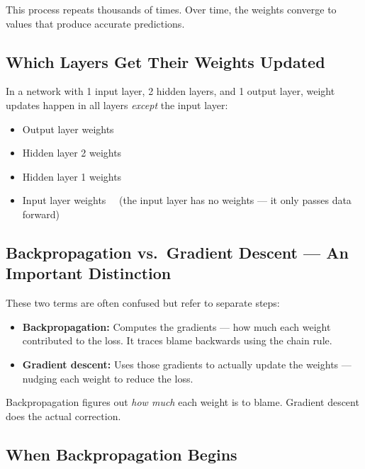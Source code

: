 This process repeats thousands of times. Over time, the weights converge to values that
produce accurate predictions.

\subsection{Which Layers Get Their Weights Updated}

In a network with 1 input layer, 2 hidden layers, and 1 output layer, weight updates
happen in all layers \textit{except} the input layer:

\begin{itemize}
    \item Output layer weights \checkmark
    \item Hidden layer 2 weights \checkmark
    \item Hidden layer 1 weights \checkmark
    \item Input layer weights \texttimes\ \ (the input layer has no weights --- it only
          passes data forward)
\end{itemize}

\subsection{Backpropagation vs.\ Gradient Descent --- An Important Distinction}

These two terms are often confused but refer to separate steps:

\begin{itemize}
    \item \textbf{Backpropagation:} Computes the gradients --- how much each weight
          contributed to the loss. It traces blame backwards using the chain rule.
    \item \textbf{Gradient descent:} Uses those gradients to actually update the weights
          --- nudging each weight to reduce the loss.
\end{itemize}

Backpropagation figures out \textit{how much} each weight is to blame. Gradient descent
does the actual correction.

\subsection{When Backpropagation Begins}

